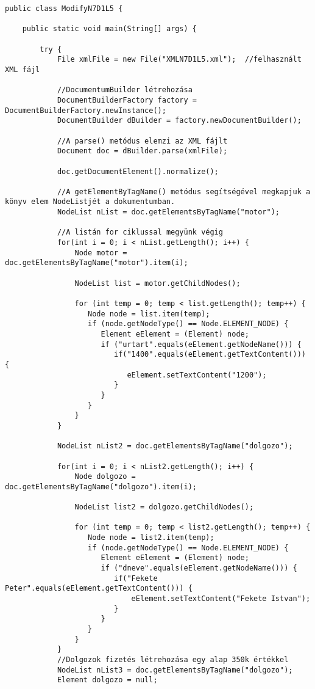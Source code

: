 \documentclass[14pt]{extarticle}
\begin{document}
\begin{normalsize}
\begin{verbatim}
public class ModifyN7D1L5 {

	public static void main(String[] args) {
		
		try {
			File xmlFile = new File("XMLN7D1L5.xml");  //felhasznált XML fájl

			//DocumentumBuilder létrehozása
			DocumentBuilderFactory factory = DocumentBuilderFactory.newInstance();
			DocumentBuilder dBuilder = factory.newDocumentBuilder();
					
			//A parse() metódus elemzi az XML fájlt
			Document doc = dBuilder.parse(xmlFile);

			doc.getDocumentElement().normalize();
			
			//A getElementByTagName() metódus segítségével megkapjuk a könyv elem NodeListjét a dokumentumban.
			NodeList nList = doc.getElementsByTagName("motor");
			
			//A listán for ciklussal megyünk végig
			for(int i = 0; i < nList.getLength(); i++) {
				Node motor = doc.getElementsByTagName("motor").item(i);
		        
		        NodeList list = motor.getChildNodes();
		        
		        for (int temp = 0; temp < list.getLength(); temp++) {
		           Node node = list.item(temp);
		           if (node.getNodeType() == Node.ELEMENT_NODE) {
		              Element eElement = (Element) node;
		              if ("urtart".equals(eElement.getNodeName())) {
		                 if("1400".equals(eElement.getTextContent())) {
		                    eElement.setTextContent("1200");
		                 }
		              }
		           }
		        }
			}
			
			NodeList nList2 = doc.getElementsByTagName("dolgozo");
			
			for(int i = 0; i < nList2.getLength(); i++) {
				Node dolgozo = doc.getElementsByTagName("dolgozo").item(i);
		        
		        NodeList list2 = dolgozo.getChildNodes();
		        
		        for (int temp = 0; temp < list2.getLength(); temp++) {
		           Node node = list2.item(temp);
		           if (node.getNodeType() == Node.ELEMENT_NODE) {
		              Element eElement = (Element) node;
		              if ("dneve".equals(eElement.getNodeName())) {
		                 if("Fekete Peter".equals(eElement.getTextContent())) {
		                	 eElement.setTextContent("Fekete Istvan");
		                 }
		              }
		           }
		        }
			}
			//Dolgozok fizetés létrehozása egy alap 350k értékkel 
			NodeList nList3 = doc.getElementsByTagName("dolgozo");
			Element dolgozo = null;
			

\end{verbatim}
\end{normalsize}
\end{document}
